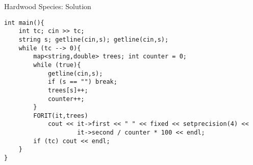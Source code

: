 \documentclass[12pt,t]{beamer}
\begin{document}
\begin{frame}[fragile]{Hardwood Species: Solution}
    \begin{verbatim}
int main(){
    int tc; cin >> tc;
    string s; getline(cin,s); getline(cin,s);
    while (tc --> 0){
        map<string,double> trees; int counter = 0;
        while (true){
            getline(cin,s);
            if (s == "") break;
            trees[s]++;
            counter++;
        }
        FORIT(it,trees)
            cout << it->first << " " << fixed << setprecision(4) << 
                    it->second / counter * 100 << endl;
        if (tc) cout << endl;
    }
}\end{verbatim}
\end{frame}
\end{document}
